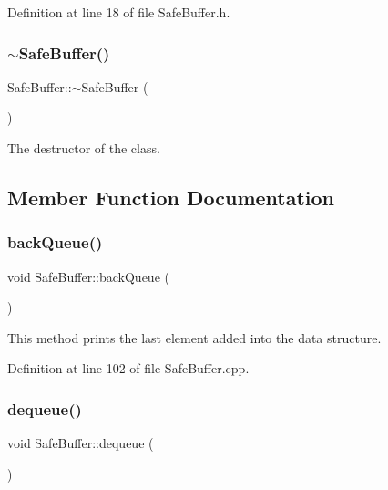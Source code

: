 Definition at line 18 of file Safe\+Buffer.\+h.

\mbox{\label{classSafeBuffer_a032ed6faedf42bfd0b79e757bf53c644}} 
\subsubsection{\texorpdfstring{$\sim$\+Safe\+Buffer()}{~SafeBuffer()}}
{\footnotesize\ttfamily Safe\+Buffer\+::$\sim$\+Safe\+Buffer (\begin{DoxyParamCaption}{ }\end{DoxyParamCaption})\hspace{0.3cm}{\ttfamily [default]}}



The destructor of the class. 



\subsection{Member Function Documentation}
\mbox{\label{classSafeBuffer_af64bc15803fd26fa02cc40357c635a33}} 
\subsubsection{\texorpdfstring{back\+Queue()}{backQueue()}}
{\footnotesize\ttfamily void Safe\+Buffer\+::back\+Queue (\begin{DoxyParamCaption}{ }\end{DoxyParamCaption})}



This method prints the last element added into the data structure. 



Definition at line 102 of file Safe\+Buffer.\+cpp.

\mbox{\label{classSafeBuffer_ae37fd5c3845e3a614e65887c2be72d07}} 
\subsubsection{\texorpdfstring{dequeue()}{dequeue()}}
{\footnotesize\ttfamily void Safe\+Buffer\+::dequeue (\begin{DoxyParamCaption}{ }\end{DoxyParamCaption})}



